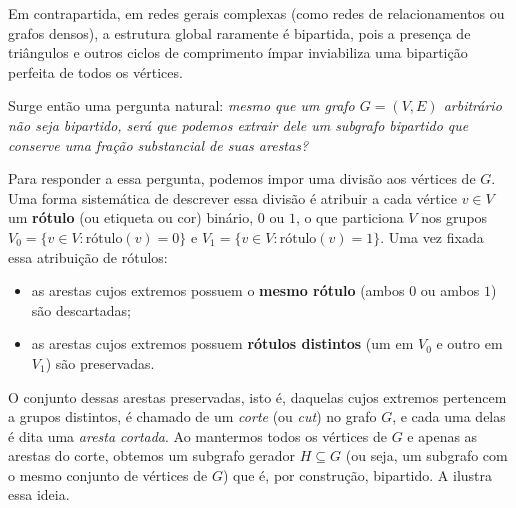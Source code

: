 \documentclass[12pt,portuguese]{article}
\theoremstyle{definition}
\begin{document}
Em contrapartida, em redes gerais complexas (como redes de relacionamentos ou
grafos densos), a estrutura global raramente é bipartida, pois a presença de
triângulos e outros ciclos de comprimento ímpar inviabiliza uma bipartição
perfeita de todos os vértices.

Surge então uma pergunta natural: \emph{mesmo que um grafo $G=(V,E)$ arbitrário
não seja bipartido, será que podemos extrair dele um subgrafo bipartido que
conserve uma fração substancial de suas arestas?}

Para responder a essa pergunta, podemos impor uma divisão aos vértices de $G$.
Uma forma sistemática de descrever essa divisão é atribuir a cada vértice $v\in
V$ um \textbf{rótulo} (ou etiqueta ou cor) binário, $0$ ou $1$, o que particiona $V$
nos grupos $V_0=\{v\in V : \text{rótulo}(v)=0\}$ e $V_1=\{v\in V :
\text{rótulo}(v)=1\}$. Uma vez fixada essa atribuição de rótulos:
\begin{itemize}
  \item as arestas cujos extremos possuem o \textbf{mesmo rótulo} (ambos $0$ ou
  ambos $1$) são descartadas;
  \item as arestas cujos extremos possuem \textbf{rótulos distintos} (um em $V_0$
  e outro em $V_1$) são preservadas.
\end{itemize}
O conjunto dessas arestas preservadas, isto é, daquelas cujos extremos pertencem
a grupos distintos, é chamado de um \emph{corte} (ou \emph{cut}) no grafo $G$, e
cada uma delas é dita uma \emph{aresta cortada}. Ao mantermos todos os vértices
de $G$ e apenas as arestas do corte, obtemos um subgrafo gerador $H\subseteq G$
(ou seja, um subgrafo com o mesmo conjunto de vértices de $G$) que é, por
construção, bipartido. A  ilustra essa ideia.
\end{document}
